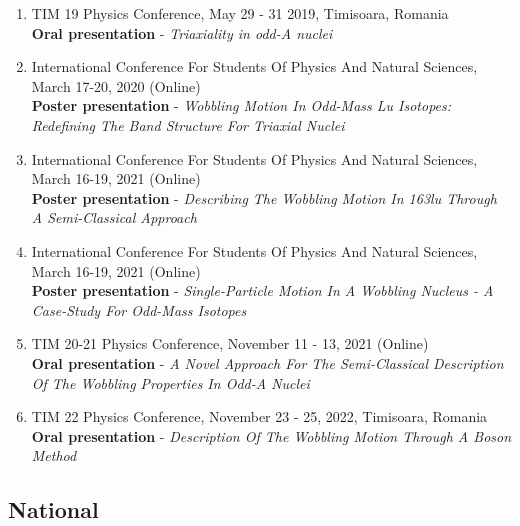 \begin{enumerate}
    \item TIM 19 Physics Conference, May 29 - 31 2019, Timisoara, Romania \\
    \textbf{Oral presentation} - \emph{Triaxiality in odd-A nuclei}
    \item International Conference For Students Of Physics And Natural Sciences, March 17-20, 2020 (Online) \\
    \textbf{Poster presentation} - \emph{Wobbling Motion In Odd-Mass Lu Isotopes: Redefining The Band Structure For Triaxial Nuclei}
    \item International Conference For Students Of Physics And Natural Sciences, March 16-19, 2021 (Online) \\
    \textbf{Poster presentation} - \emph{Describing The Wobbling Motion In 163lu Through A Semi-Classical Approach}
    \item International Conference For Students Of Physics And Natural Sciences, March 16-19, 2021 (Online) \\
    \textbf{Poster presentation} - \emph{Single-Particle Motion In A Wobbling Nucleus - A Case-Study For Odd-Mass Isotopes}
    \item TIM 20-21 Physics Conference, November 11 - 13, 2021 (Online) \\
    \textbf{Oral presentation} - \emph{A Novel Approach For The Semi-Classical Description Of The Wobbling Properties In Odd-A Nuclei}
    \item TIM 22 Physics Conference, November 23 - 25, 2022, Timisoara, Romania \\
    \textbf{Oral presentation} - \emph{Description Of The Wobbling Motion Through A Boson Method}
\end{enumerate}

\subsection{National}